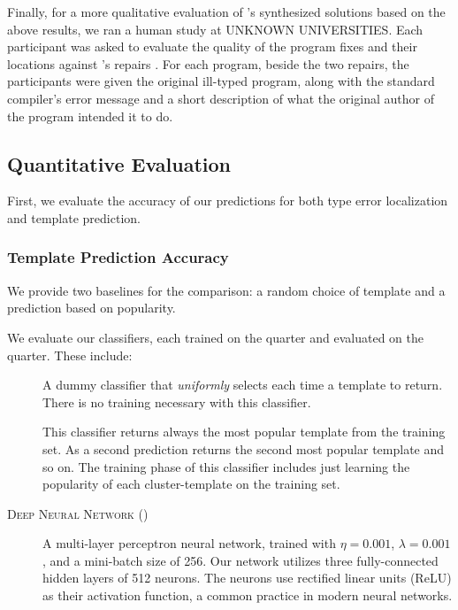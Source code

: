 Finally, for a more qualitative evaluation of \toolname's synthesized solutions
based on the above results, we ran a human study at UNKNOWN UNIVERSITIES. Each
participant was asked to evaluate the quality of the program fixes and their
locations against \seminal's repairs \citep{Lerner2006-pj, Lerner2007-dt}. For
each program, beside the two repairs, the participants were given the original
ill-typed program, along with the standard \ocaml compiler's error message and a
short description of what the original author of the program intended it to do.

\subsection{Quantitative Evaluation}
\label{subsec:quan_eval}

First, we evaluate the accuracy of our predictions for both type error
localization and template prediction.


\subsubsection{Template Prediction Accuracy}
\label{subsubsec:templ_acc}

We provide two baselines for the comparison: a random choice of template and a
prediction based on popularity.

We evaluate our classifiers, each trained on the \SPRING quarter and evaluated
on the \FALL quarter. These include:
\begin{description}
  \item[\random] A dummy classifier that \emph{uniformly} selects each time a
    template to return. There is no training necessary with this classifier.
  \item[\popular] This classifier returns always the most popular template from
    the training set. As a second prediction returns the second most popular
    template and so on. The training phase of this classifier includes just
    learning the popularity of each cluster-template on the training set.
  \item[\textsc{Deep Neural Network} (\dnn)] A multi-layer perceptron neural
    network, trained with $\eta = 0.001$, $\lambda = 0.001$, and a mini-batch
    size of 256. Our network utilizes three fully-connected hidden layers of 512
    neurons. The neurons use rectified linear units (ReLU) as their activation
    function, a common practice in modern neural networks.
\end{description}

